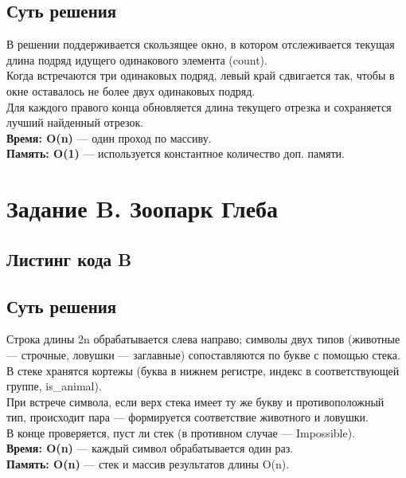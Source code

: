 \documentclass[a4paper,12pt]{article}
\begin{document}
    \subsection*{Суть решения}
    В решении поддерживается скользящее окно, в котором отслеживается текущая длина подряд идущего одинакового элемента (count).\\
    Когда встречаются три одинаковых подряд, левый край сдвигается так, чтобы в окне оставалось не более двух одинаковых подряд.\\
    Для каждого правого конца обновляется длина текущего отрезка и сохраняется лучший найденный отрезок.
    \\
    \textbf{Время: O(n)} — один проход по массиву.\\
    \textbf{Память: O(1)} — используется константное количество доп. памяти.


    \newpage


    \section{Задание B. Зоопарк Глеба}

    \subsection*{Листинг кода B}
    

    \subsection*{Суть решения}
    Строка длины 2n обрабатывается слева направо; символы двух типов (животные — строчные, ловушки — заглавные) сопоставляются по букве с помощью стека.\\
    В стеке хранятся кортежы (буква в нижнем регистре, индекс в соответствующей группе, is\_animal).\\
    При встрече символа, если верх стека имеет ту же букву и противоположный тип, происходит пара — формируется соответствие животного и ловушки.\\
    В конце проверяется, пуст ли стек (в противном случае — Impossible).
    \\
    \textbf{Время: O(n)} — каждый символ обрабатывается один раз.\\
    \textbf{Память: O(n)} — стек и массив результатов длины O(n).

    \newpage
\end{document}
